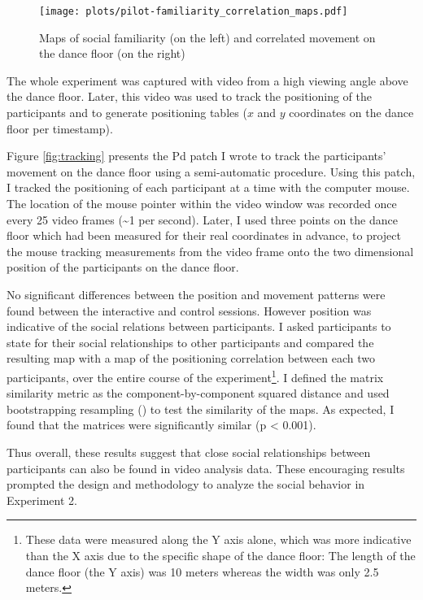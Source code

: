\documentclass[a4paper,11pt]{article}
\begin{document}
{\begin{figure}[!htb]
    \centering
    \texttt{[image: plots/pilot-familiarity\_correlation\_maps.pdf]}
    \caption{Maps of social familiarity (on the left) and correlated movement on the dance floor (on the right)}\label{plot:pilot-familiarity_correlation_maps}
\end{figure}

The whole experiment was captured with video from a high viewing angle above the dance floor.
Later, this video was used to track the positioning of the participants and to generate positioning tables ($x$ and $y$ coordinates on the dance floor per timestamp).

Figure \ref{fig:tracking} presents the Pd patch I wrote to track the participants' movement on the dance floor using a semi-automatic procedure.
Using this patch, I tracked the positioning of each participant at a time with the computer mouse.
The location of the mouse pointer within the video window was recorded once every 25 video frames (\textasciitilde{}1 per second).
Later, I used three points on the dance floor which had been measured for their real coordinates in advance, to project the mouse tracking measurements from the video frame onto the two dimensional position of the participants on the dance floor.

No significant differences between the position and movement patterns were found between the interactive and control sessions.
However position was indicative of the social relations between participants.
I asked participants to state for their social relationships to other participants and compared the resulting map with a map of the positioning correlation between each two participants, over the entire course of the experiment\footnote{These data were measured along the Y axis alone, which was more indicative than the X axis due to the specific shape of the dance floor: The length of the dance floor (the Y axis) was 10 meters whereas the width was only 2.5 meters.}.
I defined the matrix similarity metric as the component-by-component squared distance and used bootstrapping resampling (\cite{good2006permutation}) to test the similarity of the maps.
As expected, I found that the matrices were significantly similar (p \textless{} 0.001).

Thus overall, these results suggest that close social relationships between participants can also be found in video analysis data.
These encouraging results prompted the design and methodology to analyze the social behavior in Experiment 2.

}
\end{document}
